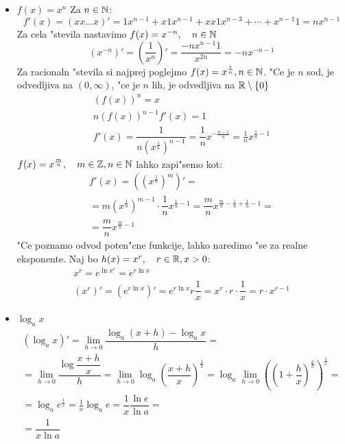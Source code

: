 \begin{itemize}
\item $f(x) = x^n$
\label{proof:1}
Za $n \in \mathbb{N}$:
\begin{equation*}
f'(x) = (xx\ldots x)' = 1 x^{n-1} + x 1 x^{n-1} + xx1x^{n-3} + \cdots + x^{n-1}1 = nx^{n-1}
\end{equation*}
Za cela "stevila nastavimo $f(x) = x^{-n}, \quad n \in \mathbb{N}$
\begin{equation*}
(x^{-n})' = \left(\dfrac{1}{x^n}\right)' = \dfrac{-nx^{n-1} 1}{x^{2n}} = -nx^{-n-1}
\end{equation*}
Za racionaln "stevila si najprej poglejmo $f(x) = x^{\frac{1}{n}}, n \in \mathbb{N}$. "Ce je $n$ sod, je odvedljiva na $(0, \infty)$, "ce je $n$ lih, je odvedljiva na $\mathbb{R} \setminus \{0\}$
\begin{gather*}
(f(x))^n = x \\
n (f(x))^{n-1} f'(x) = 1\\
f'(x) = \dfrac{1}{n (x^{\frac{1}{n}})^{n-1}}  = \dfrac{1}{n} x^{- \frac{n - 1}{n}} = \frac{1}{n} x^{\frac{1}{n} - 1}
\end{gather*}
%
$f(x) = x^{\frac{m}{n}}, \quad m \in \mathbb{Z}, n \in \mathbb{N}$ lahko zapi"semo kot:
\begin{multline*}
f'(x) = \left(\left(x^{\frac{1}{n}}\right)^m\right)' = \\
= m \left(x ^ {\frac{1}{n}}\right)^{m-1} \cdot \dfrac{1}{n} x^{\frac{1}{n}-1} = \dfrac{m}{n} x^{\frac{m}{n} - \frac{1}{n} + \frac{1}{n} - 1} = \\
=\dfrac{m}{n} x^{\frac{m}{n}-1}
\end{multline*}
"Ce poznamo odvod poten"cne funkcije, lahko naredimo "se za realne eksponente. Naj bo $h(x) = x^r, \quad r \in \mathbb{R}, x > 0$:
\begin{gather*}
x^r = e^{\ln x^r} = e^{r \ln x} \\
(x^r)' = (e ^{r \ln x})' = e^{r \ln x} r \dfrac{1}{x} = x^r \cdot r \cdot \dfrac{1}{x} = r \cdot x^{r-1}
\end{gather*}

\item $\log_a x$
\label{proof:2}
\begin{multline*}
(\log_a x)' = \lim_{h \to 0} \dfrac{\log_a (x+h) - \log_a x}{h} = \\
= \lim_{h \to 0} \dfrac{\log \dfrac{x + h}{x}}{h} = \lim_{h \to 0} \log_a \left(\dfrac{x+h}{x}\right)^\frac{1}{h} = \log_a \lim_{h \to 0} \left(\left(1+ \dfrac{h}{x}\right)^{\frac{x}{h}}\right)^{\frac{1}{x}} = \\
= \log_a e^\frac{1}{x} = \frac{1}{x} \log_a e = \dfrac{1}{x} \dfrac{\ln e}{\ln a} = \\
= \dfrac{1}{x \ln a}
\end{multline*}


\end{itemize}

